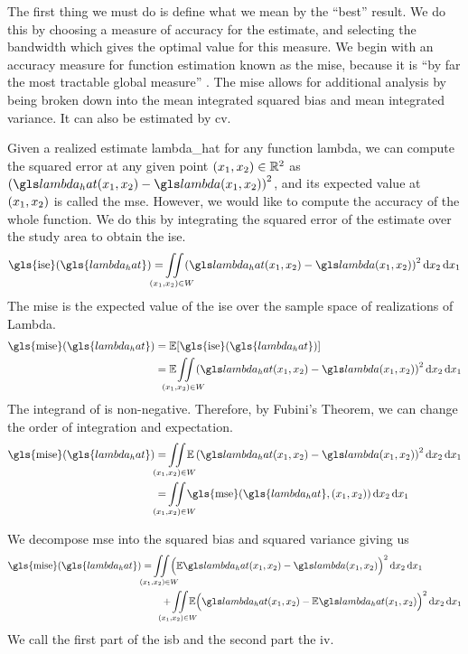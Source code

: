 The first thing we must do is define what we mean by the ``best'' result.
We do this by choosing a measure of accuracy for the estimate,
and selecting the bandwidth which gives the optimal value for this measure.
We begin with an accuracy measure for function estimation known as the \gls{mise},
because it is ``by far the most tractable global measure'' \citep[p. 35]{silverman1986density}.
The \gls{mise} allows for additional analysis by being broken down into the mean integrated squared bias and mean integrated variance.
It can also be estimated by \acrlong{cv}.

Given a realized estimate \gls{lambda_hat} for any function \gls{lambda},
we can compute the squared error at any given point $(x_1, x_2) \in \mathbb{R}^2$ as
$\left( \lmbdhat - \lmbd \right)^2$,
and its expected value at $(x_1, x_2)$ is called the \gls{mse}.
However,
we would like to compute the accuracy of the whole function.
We do this by integrating the squared error of the estimate over the study area to obtain the \gls{ise}.
\begin{equation}
\label{eq:ise}
    \mbox{\gls{ise}}(\gls{lambda_hat}) = \iintW{
            \left( \lmbdhat - \lmbd \right)^2
    }
\end{equation}
The \gls{mise} is the expected value of the \gls{ise} over the sample space of realizations of \gls{Lambda}.
\begin{align}
    \mbox{\gls{mise}}(\gls{lambda_hat}) 
        & = \E [\mbox{\gls{ise}}(\gls{lambda_hat})] \nonumber \\
        & = \E \iintW{ \left( \lmbdhat - \lmbd \right)^2 } \label{eq:mise}
\end{align}
The integrand of  is non-negative.
Therefore, by Fubini's Theorem, we can change the order of integration and expectation.
\begin{align}
    \mbox{\gls{mise}}(\gls{lambda_hat}) 
        & = \iintW{ \E \left( \lmbdhat - \lmbd \right)^2 } \nonumber \\
        & = \iintW{ \mbox{\gls{mse}}(\gls{lambda_hat}, \xvec) } \nonumber
\end{align}

We decompose \gls{mse} into the squared bias and squared variance%
giving us
\begin{align}
    \mbox{\gls{mise}}(\gls{lambda_hat}) 
        & = \iintW{ \Big( \E\lmbdhat - \lmbd \Big)^2 } \nonumber \\
        & \qquad + \iintW{ \E \Big( \lmbdhat - \E\lmbdhat \Big)^2 } \label{eq:mise:intbiasvariance}
\end{align}
We call the first part of  the \gls{isb} and the second part the \gls{iv}.

